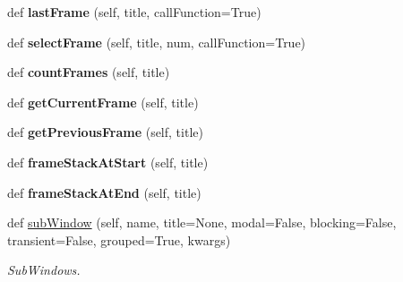 \begin{DoxyCompactItemize}
\mbox{\label{class_python_01_g_u_i_1_1appjar_1_1gui_a4ef54bd99c0114ad0203849d84db0523}} 
def {\bfseries last\+Frame} (self, title, call\+Function=True)
\item 
\mbox{\label{class_python_01_g_u_i_1_1appjar_1_1gui_afce323381e8d4c435b0039475814bd54}} 
def {\bfseries select\+Frame} (self, title, num, call\+Function=True)
\item 
\mbox{\label{class_python_01_g_u_i_1_1appjar_1_1gui_a082e6d0e3964dfa4e4b61a21f58eaeff}} 
def {\bfseries count\+Frames} (self, title)
\item 
\mbox{\label{class_python_01_g_u_i_1_1appjar_1_1gui_a4e3440744cb97d81526b944c0ed52787}} 
def {\bfseries get\+Current\+Frame} (self, title)
\item 
\mbox{\label{class_python_01_g_u_i_1_1appjar_1_1gui_a2102bf8b7a704a3db225fe3815d2bd12}} 
def {\bfseries get\+Previous\+Frame} (self, title)
\item 
\mbox{\label{class_python_01_g_u_i_1_1appjar_1_1gui_a1044b27d9b071a367d2f1d734e78972a}} 
def {\bfseries frame\+Stack\+At\+Start} (self, title)
\item 
\mbox{\label{class_python_01_g_u_i_1_1appjar_1_1gui_a8cee8eb2aa04961d00be8132dc6245ef}} 
def {\bfseries frame\+Stack\+At\+End} (self, title)
\item 
\mbox{\label{class_python_01_g_u_i_1_1appjar_1_1gui_a17276098d7012d1e251bfafd32b3917f}} 
def \hyperlink{class_python_01_g_u_i_1_1appjar_1_1gui_a17276098d7012d1e251bfafd32b3917f}{sub\+Window} (self, name, title=None, modal=False, blocking=False, transient=False, grouped=True, kwargs)
\begin{DoxyCompactList}\small\item\em Sub\+Windows. \end{DoxyCompactList}\item 
\mbox{\label{class_python_01_g_u_i_1_1appjar_1_1gui_ac636b7aae9efc600b83ed80dbefa6c6b}} 

\end{DoxyCompactItemize}
